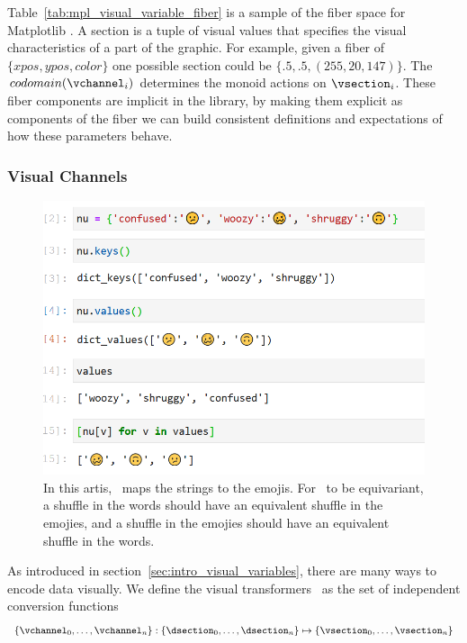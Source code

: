 \documentclass[../main.tex]{subfiles}
\begin{document}
Table~\ref{tab:mpl_visual_variable_fiber} is a sample of the fiber space for Matplotlib \cite{hunterMatplotlib2DGraphics2007}. A section \vsection is a tuple of visual values that specifies the visual characteristics of a part of the graphic. For example, given a fiber of $\{xpos, ypos, color\}$ one possible section could be  $\{.5, .5, (255, 20,147)\}$. The $codomain(\vchannel_i)$ determines the monoid actions on $\vsection_i$. These fiber components are implicit in the library, by making them explicit as components of the fiber we can build consistent definitions and expectations of how these parameters behave. 

\subsubsection{Visual Channels}
\label{sec:artist_nu}
\begin{figure}
    \includegraphics[width=\textwidth]{figures/math/equivariance_nu.png}
    \caption{In this artis, \vchannel\ maps the strings to the emojis. For \vchannel\ to be equivariant, a shuffle in the words should have an equivalent shuffle in the emojies, and a shuffle in the emojies should have an equivalent shuffle in the words.}
    \label{fig:artist_nu}
\end{figure}
As introduced in section~\ref{sec:intro_visual_variables}, there are many ways to encode data visually. We define the visual transformers \vchannel\ as the set of independent conversion functions 
\begin{equation}
    \label{eq:nu_expanded}
    \{\vchannel_{0}, \ldots, \vchannel_{n}\}: \{\dsection_{0}, \ldots, \dsection_{n}\} \mapsto \{\vsection_{0}, \ldots, \vsection_{n}\}
\end{equation}
\end{document}

